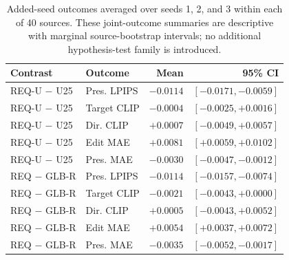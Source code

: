 \begin{table}[!t]
\centering\small
\caption{Added-seed outcomes averaged over seeds 1, 2, and 3 within each of 40 sources. These joint-outcome summaries are descriptive with marginal source-bootstrap intervals; no additional hypothesis-test family is introduced.}
\label{tab:r91-joint}
\begin{tabular}{llrr}
\toprule
Contrast & Outcome & Mean & 95\% CI\\
\midrule
REQ-U $-$ U25 & Pres. LPIPS & $-0.0114$ & $[-0.0171, -0.0059]$\\
REQ-U $-$ U25 & Target CLIP & $-0.0004$ & $[-0.0025, +0.0016]$\\
REQ-U $-$ U25 & Dir. CLIP & $+0.0007$ & $[-0.0049, +0.0057]$\\
REQ-U $-$ U25 & Edit MAE & $+0.0081$ & $[+0.0059, +0.0102]$\\
REQ-U $-$ U25 & Pres. MAE & $-0.0030$ & $[-0.0047, -0.0012]$\\
REQ $-$ GLB-R & Pres. LPIPS & $-0.0114$ & $[-0.0157, -0.0074]$\\
REQ $-$ GLB-R & Target CLIP & $-0.0021$ & $[-0.0043, +0.0000]$\\
REQ $-$ GLB-R & Dir. CLIP & $+0.0005$ & $[-0.0043, +0.0052]$\\
REQ $-$ GLB-R & Edit MAE & $+0.0054$ & $[+0.0037, +0.0072]$\\
REQ $-$ GLB-R & Pres. MAE & $-0.0035$ & $[-0.0052, -0.0017]$\\
\bottomrule
\end{tabular}
\end{table}
